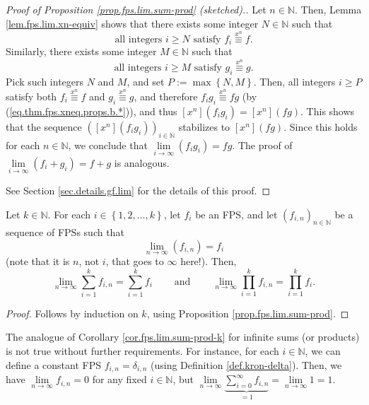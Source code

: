 \begin{proof}
[Proof of Proposition \ref{prop.fps.lim.sum-prod} (sketched).]Let
$n\in\mathbb{N}$. Then, Lemma \ref{lem.fps.lim.xn-equiv} shows that there
exists some integer $N\in\mathbb{N}$ such that
\[
\text{all integers }i\geq N\text{ satisfy }f_{i}\overset{x^{n}}{\equiv}f.
\]
Similarly, there exists some integer $M\in\mathbb{N}$ such that%
\[
\text{all integers }i\geq M\text{ satisfy }g_{i}\overset{x^{n}}{\equiv}g.
\]
Pick such integers $N$ and $M$, and set $P:=\max\left\{  N,M\right\}  $. Then,
all integers $i\geq P$ satisfy both $f_{i}\overset{x^{n}}{\equiv}f$ and
$g_{i}\overset{x^{n}}{\equiv}g$, and therefore $f_{i}g_{i}\overset{x^{n}%
}{\equiv}fg$ (by (\ref{eq.thm.fps.xneq.props.b.*})), and thus $\left[
x^{n}\right]  \left(  f_{i}g_{i}\right)  =\left[  x^{n}\right]  \left(
fg\right)  $. This shows that the sequence $\left(  \left[  x^{n}\right]
\left(  f_{i}g_{i}\right)  \right)  _{i\in\mathbb{N}}$ stabilizes to $\left[
x^{n}\right]  \left(  fg\right)  $. Since this holds for each $n\in\mathbb{N}%
$, we conclude that $\lim\limits_{i\rightarrow\infty}\left(  f_{i}%
g_{i}\right)  =fg$. The proof of $\lim\limits_{i\rightarrow\infty}\left(
f_{i}+g_{i}\right)  =f+g$ is analogous.

See Section \ref{sec.details.gf.lim} for the details of this proof.
\end{proof}

\begin{corollary}
\label{cor.fps.lim.sum-prod-k}Let $k\in\mathbb{N}$. For each $i\in\left\{
1,2,\ldots,k\right\}  $, let $f_{i}$ be an FPS, and let $\left(
f_{i,n}\right)  _{n\in\mathbb{N}}$ be a sequence of FPSs such that%
\[
\lim\limits_{n\rightarrow\infty}\left(  f_{i,n}\right)  =f_{i}%
\]
(note that it is $n$, not $i$, that goes to $\infty$ here!). Then,%
\[
\lim\limits_{n\rightarrow\infty}\sum_{i=1}^{k}f_{i,n}=\sum_{i=1}^{k}%
f_{i}\ \ \ \ \ \ \ \ \ \ \text{and}\ \ \ \ \ \ \ \ \ \ \lim
\limits_{n\rightarrow\infty}\prod_{i=1}^{k}f_{i,n}=\prod_{i=1}^{k}f_{i}.
\]

\end{corollary}

\begin{proof}
Follows by induction on $k$, using Proposition \ref{prop.fps.lim.sum-prod}.
\end{proof}

\begin{remark}
The analogue of Corollary \ref{cor.fps.lim.sum-prod-k} for infinite sums (or
products) is not true without further requirements. For instance, for each
$i\in\mathbb{N}$, we can define a constant FPS $f_{i,n}=\delta_{i,n}$ (using
Definition \ref{def.kron-delta}). Then, we have $\lim\limits_{n\rightarrow
\infty}f_{i,n}=0$ for any fixed $i\in\mathbb{N}$, but $\lim
\limits_{n\rightarrow\infty}\underbrace{\sum_{i=0}^{\infty}f_{i,n}}_{=1}%
=\lim\limits_{n\rightarrow\infty}1=1$.
\end{remark}

